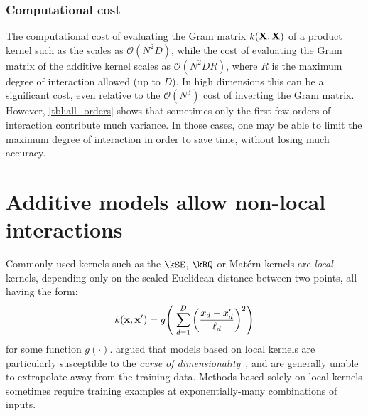 

\subsubsection{Computational cost}
The computational cost of evaluating the Gram matrix $k(\mathbf{X}, \mathbf{X})$ of a product kernel such as the \seard{} scales as $\mathcal{O}(N^2D)$, while the cost of evaluating the Gram matrix of the additive kernel scales as $\mathcal{O}(N^2DR)$, where $R$ is the maximum degree of interaction allowed (up to $D$).
In high dimensions this can be a significant cost, even relative to the $\mathcal{O}(N^3)$ cost of inverting the Gram matrix.
However, \cref{tbl:all_orders} shows that sometimes only the first few orders of interaction contribute much variance.
In those cases, one may be able to limit the maximum degree of interaction in order to save time, without losing much accuracy.



\section{Additive models allow non-local interactions}

Commonly-used kernels such as the $\kSE$, $\kRQ$ or Mat\'{e}rn kernels are \emph{local} kernels, depending only on the scaled Euclidean distance between two points, all having the form:
\begin{align}
k({\bf x, x'}) = g \!\left( \; \sum_{d=1}^D \left( \frac{  x_{d} - x_{d}' }{ \ell_d } \right)^2 \right)
\end{align}
for some function $g(\cdot)$.
\citet{bengio2006curse} argued that models based on local kernels are particularly susceptible to the \emph{curse of dimensionality}~\citep{bellman1956dynamic}, and are generally unable to extrapolate away from the training data.
Methods based solely on local kernels sometimes require training examples at exponentially-many combinations of inputs.

